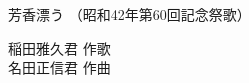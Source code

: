 \documentclass[10pt,b5j]{tarticle} %
\begin{document}
\begin{minipage}[c]{0.7\hsize} %
    \begin{center}
        {\LARGE
            芳香漂う %
        }
        {\small 
            （昭和42年第60回記念祭歌） %
        }
    \end{center}
\end{minipage}
\begin{minipage}[c]{0.3\hsize} %
    \begin{flushright} %
        稲田雅久君 作歌\\名田正信君 作曲 %
    \end{flushright}
\end{minipage}
\end{document}
